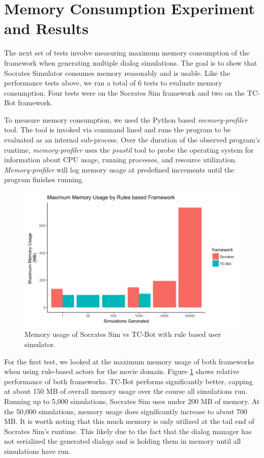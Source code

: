 \section{Memory Consumption Experiment and Results}

The next set of tests involve measuring maximum memory consumption of the framework when generating multiple dialog simulations. The goal is to show that Socrates Simulator consumes memory reasonably and is usable. Like the performance tests above, we ran a total of 6 tests to evaluate memory consumption. Four tests were on the Socrates Sim framework and two on the TC-Bot framework.

To measure memory consumption, we used the Python based \textit{memory-profiler} tool. The tool is invoked via command lined and runs the program to be evaluated as an internal sub-process. Over the duration of the observed program's runtime, \textit{memory-profiler} uses the \textit{psustil} tool to probe the operating system for information about CPU usage, running processes, and resource utilization. \textit{Memory-profiler} will log memory usage at predefined increments until the program finishes running. 

\begin{figure}[h!]
	\label{fig:mem_usage_rules}
	\includegraphics[width=\linewidth]{diagrams/mem_usage_rules.jpeg}
	\caption{ Memory usage of Socrates Sim vs TC-Bot with rule based user simulator.}
\end{figure}

For the first test, we looked at the maximum memory usage of both frameworks when using rule-based actors for the movie domain. Figure \ref{fig:mem_usage_rules} shows relative performance of both frameworks. TC-Bot performs significantly better, capping at about 150 MB of overall memory usage over the course all simulations run. Running up to 5,000 simulations, Socrates Sim uses under 200 MB of memory. At the 50,000 simulations, memory usage does significantly increase to about 700 MB. It is worth noting that this much memory is only utilized at the tail end of Socrates Sim's runtime. This likely due to the fact that the dialog manager has not serialized the generated dialogs and is holding them in memory until all simulations have run.  

